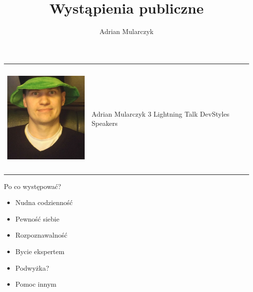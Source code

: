 \documentclass{beamer}
\title[]
{Wystąpienia publiczne}
\author[Adrian Mularczyk]{Adrian Mularczyk}
\institute[PGS Softwarei]
{
PGS Software
}
\date{}
\begin{document}
\begin{frame}
  \titlepage 
\end{frame}

\begin{frame}{}
	\begin{tabular}{ p{5cm} p{5cm} }
		\begin{minipage}{.4\textwidth}
			\begin{center}
  				\includegraphics[height=5cm]{ja.png}
			\end{center}
   		 \end{minipage}
   		 &
		\begin{minipage}{.7\textwidth}
  					\Huge{Adrian Mularczyk} \newline \newline
					\Large{3 Lightning Talk} \newline \newline
					\Large{DevStyles Speakers}
   		 \end{minipage}
	\end{tabular}
\end{frame}

\begin{frame}{}
	\begin{center}
		\Huge{Po co występować?}
	\end{center}
\end{frame}

\begin{frame}{}
	\begin{Large}
		\begin{itemize}
			\item Nudna codzienność
			\item Pewność siebie
			\item Rozpoznawalność
			\item Bycie ekspertem
			\item Podwyżka?
			\item Pomoc innym	
		\end{itemize}
	\end{Large}
\end{frame}
\end{document}
